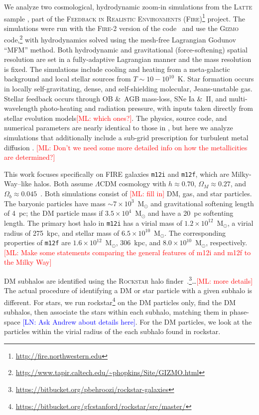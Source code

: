 \documentclass[twocolumn,preprintnumbers]{aastex6}
\def\ML#1{\textcolor{red}{[ML: #1]}}
\def\lmn#1{\textcolor{blue}{[LN: #1]}}
\begin{document}
We analyze two cosmological, hydrodynamic zoom-in simulations \citep{KatzWhite1993,Onorbe2014} from the \textsc{Latte} sample \citep{Wetzel2016}, part of the \textsc{Feedback in Realistic Environments} (\textsc{Fire})\footnote{\url{http://fire.northwestern.edu}} project.  The simulations were run with the \textsc{Fire-2} version of the code~\cite{2017arXiv170206148H} and use the \textsc{Gizmo} \citep{Hopkins:2014qka} code,\footnote{\url{http://www.tapir.caltech.edu/~phopkins/Site/GIZMO.html}} with hydrodynamics solved using the mesh-free Lagrangian Godunov ``MFM'' method. Both hydrodynamic and gravitational (force-softening) spatial resolution are set in a fully-adaptive Lagrangian manner and the mass resolution is fixed. The simulations include cooling and heating from a meta-galactic background and local stellar sources from $T\sim10-10^{10}$~K.  Star formation occurs in locally self-gravitating, dense,  and self-shielding molecular, Jeans-unstable gas.  Stellar feedback occurs through OB \&\ AGB mass-loss, SNe Ia \&\ II, and multi-wavelength photo-heating and radiation pressure, with inputs taken directly from stellar evolution models\ML{which ones?}. The physics, source code, and numerical parameters are nearly identical to those in \citet{2017arXiv170206148H}, but here we analyze simulations that additionally include a sub-grid prescription for turbulent metal diffusion \citep{2017arXiv170206148H,Escala2017}.  \ML{Don't we need some more detailed info on how the metallicities are determined?}

This work focuses specifically on \textsc{FIRE} galaxies \texttt{m12i} and \texttt{m12f}, which are Milky-Way--like halos.   Both assume $\Lambda$CDM cosmology with $h\approx 0.70$, $\Omega_M \approx 0.27$, and $\Omega_b \approx 0.045$~\citep{Ade:2013zuv}.  Both simulations consist of \ML{fill in} DM, gas, and star particles.  The baryonic particles have mass $\sim 7\times10^{3}$~M$_\odot$ and gravitational softening length of 4~pc; the DM particle mass if $3.5 \times10^4$~M$_\odot$ and have a 20~pc softenting length.  The primary host halo in \texttt{m12i} has a virial mass of $1.2\times10^{12}$~M$_\odot$, a virial radius of 275~kpc, and stellar mass of $6.5\times10^{10}$~M$_\odot$.  
The corresponding properties of \texttt{m12f} are $1.6\times10^{12}$~M$_\odot$, 306~kpc, and $8.0\times10^{10}$~M$_\odot$, respectively. 
\ML{Make some statements comparing the general features of m12i and m12f to the Milky Way}

DM subhalos are identified using the \textsc{Rockstar} halo finder~\citep{Behroozi:2011ju}.\footnote{\url{https://bitbucket.org/pbehroozi/rockstar-galaxies}}\ldots \ML{more details}
%
The actual procedure of identifying a DM or star particle with a given subhalo is different.  For stars, we run rockstar\footnote{\url{https://bitbucket.org/gfcstanford/rockstar/src/master/}} \citep{2013ApJ...762..109B} on the DM particles only, find the DM subhalos, then associate the stars within each subhalo, matching them in phase-space \lmn{Ask Andrew about details here}. For the DM particles, we look at the particles within the virial radius of the each subhalo found in rockstar.  
\end{document}

